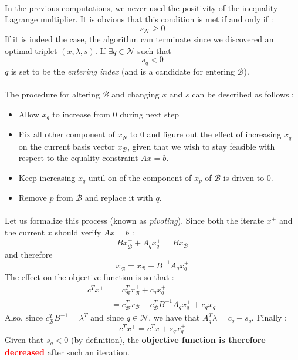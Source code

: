 \documentclass[a4paper]{article}
\begin{document}
{{			\paragraph{} In the previous computations, we never used the positivity of the inequality Lagrange multiplier. It is obvious that this condition is met if and only if :
			$$
				s_\mathcal{N} \geq 0
			$$	
			If it is indeed the case, the algorithm can terminate since we discovered an optimal triplet $(x,\lambda,s)$. If $\exists q\in\mathcal{N}$ such that 
			$$
				s_q < 0 
			$$
			$q$ is set to be the \emph{entering index} (and is a candidate for entering $\mathcal{B}$). 
			
			\paragraph{} The procedure for altering $\mathcal{B}$ and changing $x$ and $s$ can be described as follows : 
			\vspace{10pt}
			
			{
				\begin{itemize}
					\item Allow $x_q$ to increase from 0 during next step
					\item Fix all other component of $x_N$ to 0 and figure out the effect of increasing $x_q$ on the current basis vector $x_\mathcal{B}$, given that we wish to stay feasible with respect to the equality constraint $Ax=b$. 
					\item Keep increasing $x_q$ until on of the component of $x_p$ of $\mathcal{B}$ is driven to $0$. 
					\item Remove $p$ from $\mathcal{B}$ and replace it with $q$. 
				\end{itemize}				
			}
			
				\paragraph{} Let us formalize this process (known as \emph{pivoting}). Since both the iterate $x^+$ and the current $x$ should verify $Ax=b$ : 
				$$
					Bx_\mathcal{B}^+ +  A_qx_q^+ = Bx_\mathcal{B}
				$$
				and therefore 
				$$
					x_\mathcal{B}^+ = x_\mathcal{B} - B^{-1}A_qx_q^+
				$$
				The effect on the objective function is so that : 
				$$
					\begin{aligned}
						c^Tx^+ &= c_\mathcal{B}^Tx_\mathcal{B}^+ +  c_qx_q^+ \\
						  	    &= c_\mathcal{B}^Tx_\mathcal{B} - c_\mathcal{B}^TB^{-1}A_qx_q^+ +c_qx_q^+
					\end{aligned}
				$$
				Also, since $c_\mathcal{B}^TB^{-1} = \lambda^T$ and since $q\in\mathcal{N}$, we have that 
				$A^T_q\lambda = c_q - s_q $.
				Finally : 
				\begin{equation}
					c^Tx^+ = c^Tx + s_qx_q^+ 
					\label{eq::objdec}
				\end{equation}
				Given that $s_q<0$ (by definition), the \textbf{objective function is therefore \textcolor{red}{decreased}} after such an iteration. 
			
}}
\end{document}
